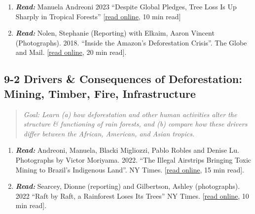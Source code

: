 \documentclass[
  10pt,
  letterpaper,
  oneside,
  open=any]{scrbook}
\begin{document}
\begin{enumerate}
\def\labelenumi{\arabic{enumi}.}
\item
  \textbf{\emph{Read:}} Manuela Andreoni 2023 ``Despite Global Pledges,
  Tree Loss Is Up Sharply in Tropical Forests''
  {[}\href{https://www.nytimes.com/2023/06/27/climate/trees-tropical-forests-deforestation.html}{read
  online}, 10 min read{]}
\item
  \textbf{\emph{Read:}} Nolen, Stephanie (Reporting) with Elkaim, Aaron
  Vincent (Photographs). 2018. ``Inside the Amazon's Deforestation
  Crisis''. The Globe and Mail.
  {[}\href{https://www.theglobeandmail.com/news/world/amazon-rainforest-deforestation-crisis/article37722932/}{read
  online}, 20 min read{]}.
\end{enumerate}

\subsection*{9-2 Drivers \& Consequences of Deforestation: Mining,
Timber, Fire,
Infrastructure}\label{drivers-consequences-of-deforestation-mining-timber-fire-infrastructure}

\begin{quote}
\emph{Goal: Learn (a) how deforestation and other human activities alter
the structure \& functioning of rain forests, and (b) compare how these
drivers differ between the African, American, and Asian tropics.}
\end{quote}

\begin{enumerate}
\def\labelenumi{\arabic{enumi}.}
\item
  \textbf{\emph{Read:}} Andreoni, Manuela, Blacki Migliozzi, Pablo
  Robles and Denise Lu. Photographs by Victor Moriyama. 2022. ``The
  Illegal Airstrips Bringing Toxic Mining to Brazil's Indigenous Land''.
  NY Times.
  {[}\href{https://www.nytimes.com/interactive/2022/08/02/world/americas/brazil-airstrips-illegal-mining.html}{read
  online}, 15 min read{]}.
\item
  \textbf{\emph{Read:}} Searcey, Dionne (reporting) and Gilbertson,
  Ashley (photographs). 2022 ``Raft by Raft, a Rainforest Loses Its
  Trees'' NY Times.
  {[}\href{https://www.nytimes.com/interactive/2022/06/14/climate/congo-rainforest-logging.html}{read
  online}, 10 min read{]}.
\end{enumerate}
\end{document}
